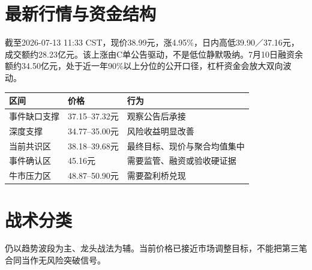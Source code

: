 \section{最新行情与资金结构}

截至2026-07-13 11:33 CST，现价38.99元，涨4.95\%，日内高低39.90／37.16元，成交额约28.23亿元。该上涨由C单公告驱动，不是低位静默吸纳。7月10日融资余额约34.50亿元，处于近一年90\%以上分位的公开口径，杠杆资金会放大双向波动。

\begin{exhibitbox}[价格行为地图]
\noindent\begin{tabularx}{\textwidth}{L{3.1cm}L{3.0cm}X}
\toprule
\textbf{区间} & \textbf{价格} & \textbf{行为} \\
\midrule
事件缺口支撑 & 37.15--37.32元 & 观察公告后承接 \\
深度支撑 & 34.77--35.00元 & 风险收益明显改善 \\
当前共识区 & 38.18--39.68元 & 最终目标、现价与聚合均值集中 \\
事件确认区 & 45.16元 & 需要监管、融资或验收硬证据 \\
牛市压力区 & 48.87--50.90元 & 需要盈利桥兑现 \\
\bottomrule
\end{tabularx}
\end{exhibitbox}

\section{战术分类}

仍以趋势波段为主、龙头战法为辅。当前价格已接近市场调整目标，不能把第三笔合同当作无风险突破信号。
